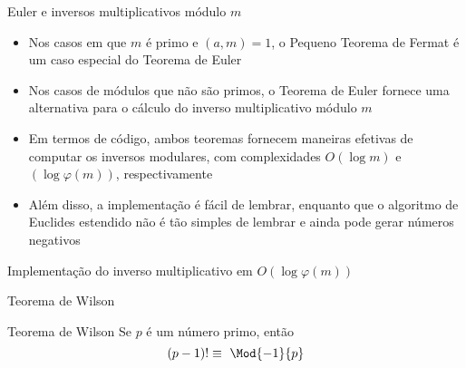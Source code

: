 \begin{frame}[fragile]{Euler e inversos multiplicativos módulo $m$}

    \begin{itemize}
        \item Nos casos em que $m$ é primo e $(a, m) = 1$, o Pequeno Teorema de Fermat é um caso 
            especial do Teorema de Euler

        \item Nos casos de módulos que não são primos, o Teorema de Euler fornece uma alternativa
            para o cálculo do inverso multiplicativo módulo $m$

        \item Em termos de código, ambos teoremas fornecem maneiras efetivas de computar os 
            inversos modulares, com complexidades $O(\log m)$ e $(\log \varphi(m))$, respectivamente

        \item Além disso, a implementação é fácil de lembrar, enquanto que 
            o algoritmo de Euclides estendido não é tão simples de lembrar e ainda pode gerar
            números negativos
    \end{itemize}

\end{frame}

\begin{frame}[fragile]{Implementação do inverso multiplicativo em $O(\log \varphi(m))$}
\end{frame}

\begin{frame}[fragile]{Teorema de Wilson}

    \begin{block}{Teorema de Wilson}
        Se $p$ é um número primo, então
        $$
            (p - 1)!\equiv\ \Mod{-1}{p}
        $$
    \end{block}

\end{frame}
